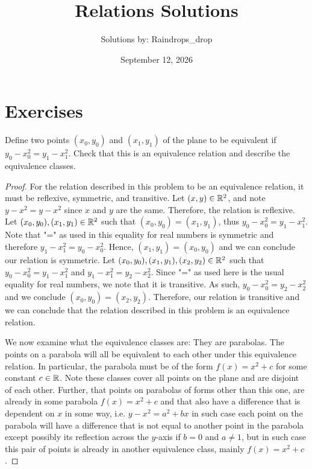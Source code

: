 \documentclass[12pt]{article}
\begin{document}
	\title{Relations Solutions}
\author{Solutions by: Raindrops\_drop}
\date{September 12, 2026}
\maketitle


\section*{Exercises}

 Define two points $(x_0, y_0)$ and $(x_1, y_1)$ of the plane to be equivalent
if $y_0 - x_0^2 = y_1 - x_1^2$. Check that this is an equivalence relation and describe
the equivalence classes.
\begin{proof}
	For the relation described in this problem to be an equivalence relation, it must
	be reflexive, symmetric, and transitive. Let $(x, y) \in \mathbb{R}^2$, and note 
	$y - x^2 = y - x^2$ since $x$ and $y$ are the same. Therefore, the relation is
	reflexive. Let $(x_0, y_0), (x_1, y_1) \in \mathbb{R}^2$ such that $(x_0, y_0) = (x_1, y_1)$, thus
	$y_0 - x_0^2 = y_1 - x_1^2$. Note that "=" as used in this equality for 
	real numbers is symmetric and therefore $y_1 - x_1^2 = y_0 - x_0^2$. Hence,
	$(x_1, y_1) = (x_0, y_0)$ and we can conclude our relation is symmetric. 
	Let $(x_0, y_0), (x_1, y_1), (x_2, y_2) \in \mathbb{R}^2$ such that 
	$y_0 - x_0^2 = y_1 - x_1^2$ and $y_1 - x_1^2 = y_2 - x_2^2$. Since "=" as used
	here is the usual equality for real numbers, we note that it is transitive.
	As such, $y_0 - x_0^2 = y_2 - x_2^2$ and we conclude $(x_0, y_0) = (x_2, y_2)$.
	Therefore, our relation is transitive and we can conclude that the relation
	described in this problem is an equivalence relation.
	
	We now examine what the equivalence classes are: They are parabolas. The points on
	a parabola will all be equivalent to each other under this equivalence relation. 
	In particular, the parabola must be of the form $f(x) = x^2 + c$ for some
	constant $c \in \mathbb{R}$. Note these classes cover all points on the plane and are
	disjoint of each other. Further, that points on parabolas of forms other than 
	this one, are already in some parabola $f(x) = x^2 + c$ and that 
	also have a difference that is dependent on $x$ in some way, i.e. $y - x^2 = a^2 + bx$
	in such case each point on the parabola will have a difference that is
	not equal to another point in the parabola except possibly its reflection across the
	$y$-axis if $b = 0$ and $a \neq 1$, but in such case this pair of points is already
	in another equivalence class, mainly $f(x) = x^2 + c$.
\end{proof}
\end{document}
